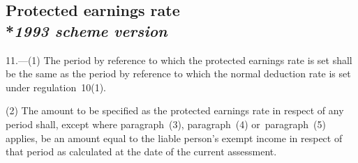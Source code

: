 \documentclass[12pt,a4paper]{article}
\begin{document}

\subsection[11. Protected earnings rate --- \emph{1993 scheme version}]{Protected earnings rate\\*\emph{1993 scheme version}}

11.—(1) The period by reference to which the protected earnings rate is set shall be the same as the period by reference to which the normal deduction rate is set under regulation~10(1).

(2) The amount to be specified as the protected earnings rate in respect of any period shall, except where 
paragraph~(3), paragraph~(4) or~paragraph~(5)  %
applies,  %
be an amount equal to the liable person’s exempt income in respect of that period as calculated at the date of the current assessment.
\end{document}

